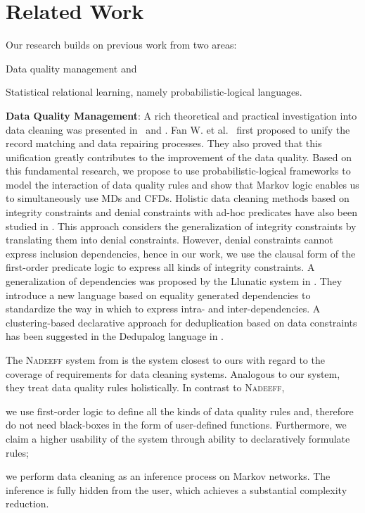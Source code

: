 \section{Related Work}
\label{sec:related}

Our research builds on previous work from two areas: 
\begin{inparaenum}[\itshape 1\upshape)]
\item Data quality management and
\item Statistical relational learning, namely probabilistic-logical languages.
\end{inparaenum}

\textbf{Data Quality Management}: A rich theoretical and practical investigation into data cleaning was presented in~\cite{Fan:2014:IRM:2628135.2567657} and \cite{fellegi1976systematic}. Fan W. et al.~\cite{Fan:2011:IRM:1989323.1989373} first proposed to unify the record matching and data repairing processes. They also proved that this unification greatly contributes to the improvement of the data quality. Based on this fundamental research, we propose to use probabilistic-logical frameworks to model the interaction of data quality rules and show that Markov logic enables us to simultaneously use MDs and CFDs. Holistic data cleaning methods based on integrity constraints and denial constraints with ad-hoc predicates have also been studied in \cite{chu2013holistic}. This approach considers the generalization of integrity constraints by translating them into denial constraints. However, denial constraints cannot express inclusion dependencies, hence in our work, we use the clausal form of the first-order predicate logic to express all kinds of integrity constraints. A generalization of dependencies was proposed by the Llunatic system in \cite{llunaticVDLB2013b}. They introduce a new language based on equality generated dependencies to standardize the way in which to express intra- and inter-dependencies. A clustering-based declarative approach for deduplication based on data constraints has been suggested in the Dedupalog language in \cite{Arasu:2009:LDC:1546683.1547340}.

The \textsc{Nadeeff} system from \cite{Dallachiesa:2013:NCD:2463676.2465327} is the system closest to ours with regard to the coverage of requirements for data cleaning systems. Analogous to our system, they treat data quality rules holistically. In contrast to \textsc{Nadeeff}, 
\begin{inparaenum}[\itshape 1\upshape)]
	\item we use first-order logic to define all the kinds of data quality rules and, therefore do not need black-boxes in the form of user-defined functions. Furthermore, we claim a higher usability of the system through ability to declaratively formulate rules;
	\item we perform data cleaning as an inference process on Markov networks. The inference is fully hidden from the user, which achieves a substantial complexity reduction.
\end{inparaenum}  

